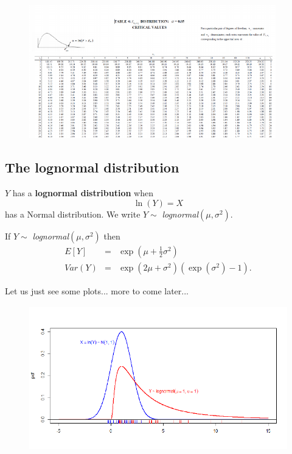 \documentclass[smaller]{beamer}\usepackage[]{graphicx}\usepackage[]{color}
\begin{document}
\begin{frame}
  \begin{figure}[ptb]\centering
  \includegraphics[height=2.2753in, width=4.2263in]{img/Fdist_table__7.pdf}%
  \end{figure}
\end{frame}%

\subsection{The lognormal distribution}

\begin{frame}{\subsecname}
  \begin{definition}
   $Y$ has a \textbf{lognormal distribution} when
   $$\ln \left( Y\right) =X$$
  has a Normal distribution. We write $Y\sim $ \emph{lognormal}$\left( \mu ,\sigma ^{2}\right) $.
  \end{definition}

  \medskip

  If $Y\sim $ \emph{lognormal}$\left( \mu ,\sigma ^{2}\right) $ then%
  \begin{eqnarray*}
  E\left[ Y\right] &=&\exp{ \left( \mu +\frac{1}{2}\sigma ^{2}\right)} \\
  Var(Y) &=&\exp{ \left( 2\mu +\sigma ^{2}\right)} \left( \exp{ \left( \sigma
  ^{2}\right)} -1\right).
  \end{eqnarray*}
\end{frame}

\begin{frame}{\subsecname}
  Let us just see some plots... more to come later...
  \begin{figure}[ptb]\centering
  \includegraphics[height=2.4856in, width=4.5in]{img/lognormal_with_rug__8.pdf}%
  \end{figure}
\end{frame}
\end{document}
